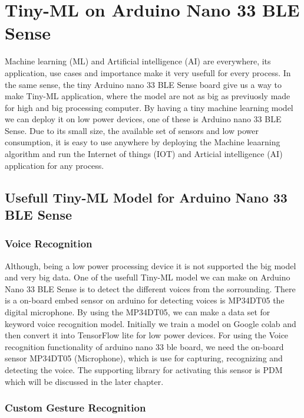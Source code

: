 %
%
%

\chapter{Tiny-ML on Arduino Nano 33 BLE Sense}

Machine learning (ML) and Artificial intelligence (AI) are everywhere, its application, use cases and importance make it very usefull for every process. In the same sense, the tiny Arduino nano 33 BLE Sense board give us a way to make Tiny-ML application, where the model are not as big as previuosly made for high and big processing computer. By having a tiny machine learning model we can deploy it on low power devices, one of these is Arduino nano 33 BLE Sense. Due to its small size, the available set of sensors and low power consumption, it is easy to use anywhere by deploying the Machine leaarning algorithm and run the Internet of things (IOT) and Articial intelligence (AI) application for any process.\cite{Dokic:2020}

\section{Usefull Tiny-ML Model for Arduino Nano 33 BLE Sense}

\subsection{Voice Recognition}

Although, being a low power processing device it is not supported the big model and very big data. One of the usefull Tiny-ML model we can make on Arduino Nano 33 BLE Sense is to detect the different voices from the sorrounding. There is a on-board embed sensor on arduino for detecting voices is MP34DT05 the digital microphone. By using the MP34DT05, we can make a data set for keyword voice recognition model. Initially we train a model on Google colab and then convert it into TensorFlow lite for low power devices.\cite{Waqar:2021} For using the Voice recognition functionality of arduino nano 33 ble board, we need the on-board sensor MP34DT05 (Microphone), which is use for capturing, recognizing and detecting the voice. The supporting library for activating this sensor is PDM which will be discussed in the later chapter.

\subsection{Custom Gesture Recognition}

